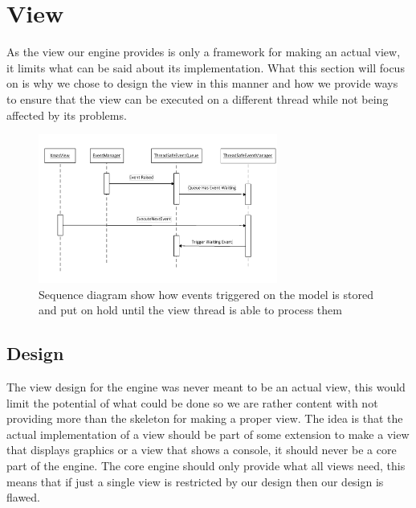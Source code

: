 
\section{View}

As the view our engine provides is only a framework for making an
actual view, it limits what can be said about its implementation.
What this section will focus on is why we chose to design the view
in this manner and how we provide ways to ensure that the view can
be executed on a different thread while not being affected by its
problems.

\begin{figure}
\begin{centering}
\includegraphics[width=0.7\textwidth]{ViewImpThreadSafeSequenceDiagram}
\par\end{centering}

\caption{Sequence diagram show how events triggered on the model is stored
and put on hold until the view thread is able to process them\label{fig:ThreadSafeSequenceDiagram}}
\end{figure}



\subsection*{Design}

The view design for the engine was never meant to be an actual view,
this would limit the potential of what could be done so we are rather
content with not providing more than the skeleton for making a proper
view. The idea is that the actual implementation of a view should
be part of some extension to make a view that displays graphics or
a view that shows a console, it should never be a core part of the
engine. The core engine should only provide what all views need, this
means that if just a single view is restricted by our design then
our design is flawed.


